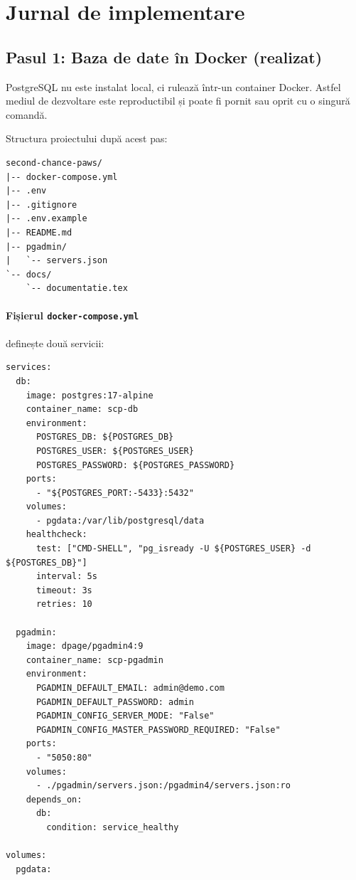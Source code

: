 \documentclass[11pt,a4paper]{article}
\newcommand{\done}{\textcolor{green!50!black}{\textbf{realizat}}}
\begin{document}
\section{Jurnal de implementare}

\subsection{Pasul 1: Baza de date în Docker (\done)}

PostgreSQL nu este instalat local, ci rulează într-un container Docker. Astfel mediul de
dezvoltare este reproductibil și poate fi pornit sau oprit cu o singură comandă.

Structura proiectului după acest pas:
\begin{lstlisting}
second-chance-paws/
|-- docker-compose.yml
|-- .env
|-- .gitignore
|-- .env.example
|-- README.md
|-- pgadmin/
|   `-- servers.json
`-- docs/
    `-- documentatie.tex
\end{lstlisting}

\paragraph{Fișierul \texttt{docker-compose.yml}} definește două servicii:
\begin{lstlisting}
services:
  db:
    image: postgres:17-alpine
    container_name: scp-db
    environment:
      POSTGRES_DB: ${POSTGRES_DB}
      POSTGRES_USER: ${POSTGRES_USER}
      POSTGRES_PASSWORD: ${POSTGRES_PASSWORD}
    ports:
      - "${POSTGRES_PORT:-5433}:5432"
    volumes:
      - pgdata:/var/lib/postgresql/data
    healthcheck:
      test: ["CMD-SHELL", "pg_isready -U ${POSTGRES_USER} -d ${POSTGRES_DB}"]
      interval: 5s
      timeout: 3s
      retries: 10

  pgadmin:
    image: dpage/pgadmin4:9
    container_name: scp-pgadmin
    environment:
      PGADMIN_DEFAULT_EMAIL: admin@demo.com
      PGADMIN_DEFAULT_PASSWORD: admin
      PGADMIN_CONFIG_SERVER_MODE: "False"
      PGADMIN_CONFIG_MASTER_PASSWORD_REQUIRED: "False"
    ports:
      - "5050:80"
    volumes:
      - ./pgadmin/servers.json:/pgadmin4/servers.json:ro
    depends_on:
      db:
        condition: service_healthy

volumes:
  pgdata:
\end{lstlisting}
\end{document}
